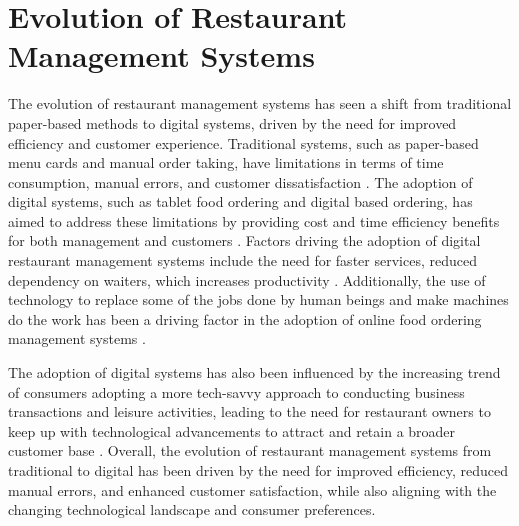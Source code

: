 \section{Evolution of Restaurant Management Systems}
The evolution of restaurant management systems has seen a shift from traditional paper-based methods to digital systems, driven by the need for improved efficiency and customer experience. Traditional systems, such as paper-based menu cards and manual order taking, have limitations in terms of time consumption, manual errors, and customer dissatisfaction \cite{1}. The adoption of digital systems, such as tablet food ordering and digital based ordering, has aimed to address these limitations by providing cost and time efficiency benefits for both management and customers \cite{1}.
Factors driving the adoption of digital restaurant management systems include the need for faster services, reduced dependency on waiters, which increases productivity \cite{3}. Additionally, the use of technology to replace some of the jobs done by human beings and make machines do the work has been a driving factor in the adoption of online food ordering management systems \cite{4}.

The adoption of digital systems has also been influenced by the increasing trend of consumers adopting a more tech-savvy approach to conducting business transactions and leisure activities, leading to the need for restaurant owners to keep up with technological advancements to attract and retain a broader customer base \cite{5}.
Overall, the evolution of restaurant management systems from traditional to digital has been driven by the need for improved efficiency, reduced manual errors, and enhanced customer satisfaction, while also aligning with the changing technological landscape and consumer preferences.

